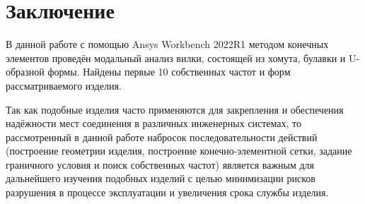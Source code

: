 \chapter*{Заключение} \label{ch-conclusion}

В данной работе с помощью Ansys Workbench 2022R1 методом конечных элементов проведён модальный анализ вилки, состоящей из хомута, булавки и U-образной формы. Найдены первые 10 собственных частот и форм рассматриваемого изделия.

Так как подобные изделия часто применяются для закрепления и обеспечения надёжности мест соединения в различных инженерных системах, то рассмотренный в данной работе набросок последовательности действий (построение геометрии изделия, построение конечно-элементной сетки, задание граничного условия и поиск собственных частот) является важным для дальнейшего изучения подобных изделий с целью минимизации рисков разрушения в процессе эксплуатации и увеличения срока службы изделия.



